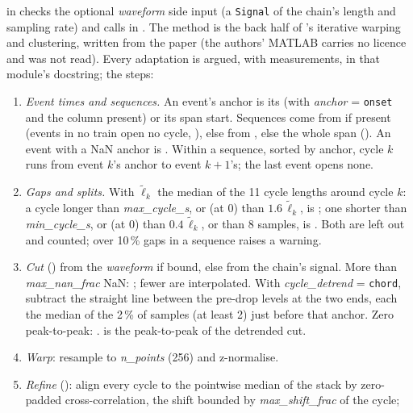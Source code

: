  in  checks the optional
\emph{waveform} side input (a \texttt{Signal} of the chain's length and sampling rate) and
calls  in . The method is the
back half of \citet{colominas2023iterative}'s iterative warping and clustering, written from
the paper (the authors' MATLAB carries no licence and was not read). Every adaptation is
argued, with measurements, in that module's docstring; the steps:

\begin{enumerate}
\item \emph{Event times and sequences.} An event's anchor is its  (with
  \emph{anchor} = \texttt{onset} and the column present) or its span start. Sequences come
  from  if present (events in no train open no cycle,
  ), else from , else the whole span ().
  An event with a NaN anchor is . Within a sequence, sorted by anchor,
  cycle $k$ runs from event $k$'s anchor to event $k{+}1$'s; the last event opens none.
\item \emph{Gaps and splits.} With $\tilde\ell_k$ the median of the 11 cycle lengths around
  cycle $k$: a cycle longer than \emph{max\_cycle\_s}, or (at 0) than $1.6\,\tilde\ell_k$,
  is ; one shorter than \emph{min\_cycle\_s}, or (at 0) than $0.4\,\tilde\ell_k$,
  or than 8 samples, is . Both are left out and counted; over 10\,\% gaps in
  a sequence raises a warning.
\item \emph{Cut} () from the \emph{waveform} if bound, else from the
  chain's signal. More than \emph{max\_nan\_frac} NaN: ; fewer are
  interpolated. With \emph{cycle\_detrend} = \texttt{chord}, subtract the straight line
  between the pre-drop levels at the two ends, each the median of the 2\,\% of samples (at
  least 2) just before that anchor. Zero peak-to-peak: .  is
  the peak-to-peak of the detrended cut.
\item \emph{Warp}: resample to \emph{n\_points} (256) and z-normalise.
\item \emph{Refine} (): align every cycle to the pointwise median of the stack by
  zero-padded cross-correlation, the shift bounded by \emph{max\_shift\_frac} of the cycle;

\end{enumerate}

